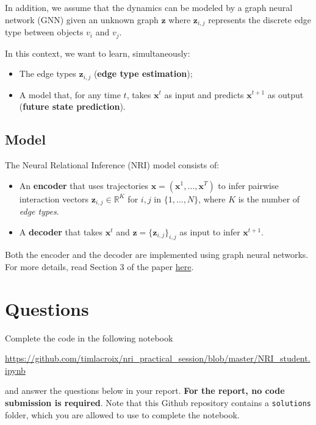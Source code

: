 \documentclass[a4paper, 11pt]{report}
\begin{document}
In addition,  we assume that the dynamics can be modeled by a graph neural network (GNN) given an unknown graph $\mathbf{z}$ where $\mathbf{z}_{i,j}$ represents the discrete edge type between objects $v_i$ and $v_j$.

In this context, we want to learn, simultaneously:

\begin{itemize}
	\item The edge types $\mathbf{z}_{i,j}$ (\textbf{edge type estimation}); 
	\item A model that, for any time $t$, takes $\mathbf{x}^t$ as input and predicts $\mathbf{x}^{t+1}$ as output (\textbf{future state prediction}).
\end{itemize}

\section{Model}

The Neural Relational Inference (NRI) model consists of:

\begin{itemize}
	\item An \textbf{encoder} that uses trajectories $\mathbf{x} = (\mathbf{x}^1, \ldots, \mathbf{x}^T)$ to infer pairwise interaction vectors $\mathbf{z}_{i, j} \in \mathbb{R}^K$ for $i, j$ in $\{1, \ldots, N \}$, where $K$ is the number of \emph{edge types}.
	\item A \textbf{decoder} that takes $\mathbf{x}^t$ and $\mathbf{z} = \{\mathbf{z}_{i, j}\}_{i,j}$ as input to infer $\mathbf{x}^{t+1}$.
\end{itemize}

Both the encoder and the decoder are implemented using graph neural networks. For more details, read Section 3 of the paper \href{https://arxiv.org/pdf/1802.04687.pdf}{here}. \\


\chapter{Questions}

Complete the code in the following notebook

\url{https://github.com/timlacroix/nri_practical_session/blob/master/NRI_student.ipynb}

and answer the questions below in your report. \textbf{For the report, no code submission is required}. Note that this Github repository contains a \texttt{solutions} folder, which you are allowed to use to complete the notebook. 
\end{document}
